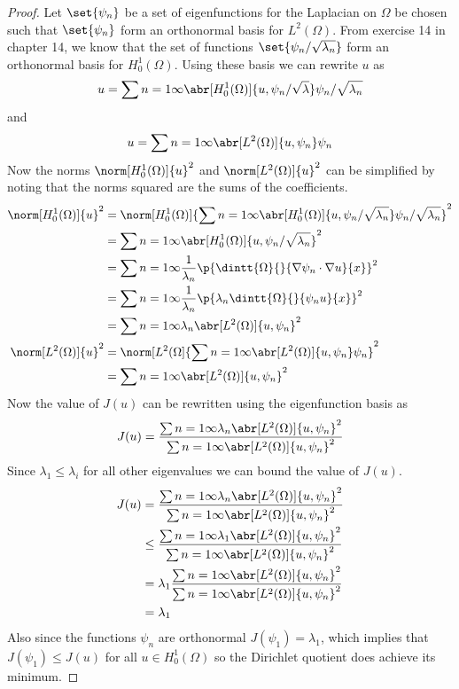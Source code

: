 \documentclass[11pt, oneside]{article}
\begin{document}
\begin{enumerate}
    \begin{proof}
      Let $\set{\psi_n}$ be a set of eigenfunctions for the Laplacian on $\Omega$
      be chosen such that $\set{\psi_n}$ form an orthonormal basis for $L^2(\Omega)$.
      From exercise 14 in chapter 14, we know that the set of functions
      $\set{\psi_n/\sqrt{\lambda_n}}$ form an orthonormal basis for $H^1_0(\Omega)$.
      Using these basis we can rewrite $u$ as
      \[
        u = \sum{n = 1}{\infty}{\abr[H_0^1(\Omega)]{u, \psi_n/\sqrt{\lambda}} \psi_n/\sqrt{\lambda_n}}
      \]
      and
      \[
        u = \sum{n = 1}{\infty}{\abr[L^2(\Omega)]{u, \psi_n} \psi_n}
      \]
      Now the norms $\norm[H_0^1(\Omega)]{u}^2$ and $\norm[L^2(\Omega)]{u}^2$
      can be simplified by noting that the norms squared are the sums of the coefficients.
      \begin{align*}
        \norm[H_0^1(\Omega)]{u}^2 &= \norm[H_0^1(\Omega)]{\sum{n = 1}{\infty}{\abr[H_0^1(\Omega)]{u, \psi_n/\sqrt{\lambda_n}} \psi_n/\sqrt{\lambda_n}}}^2 \\
        &= \sum{n = 1}{\infty}{\abr[H_0^1(\Omega)]{u, \psi_n/\sqrt{\lambda_n}}^2} \\
        &= \sum{n = 1}{\infty}{\frac{1}{\lambda_n}\p{\dintt{\Omega}{}{\nabla \psi_n \cdot \nabla u}{x}}^2} \\
        &= \sum{n = 1}{\infty}{\frac{1}{\lambda_n}\p{\lambda_n\dintt{\Omega}{}{\psi_n u}{x}}^2} \\
        &= \sum{n = 1}{\infty}{\lambda_n \abr[L^2(\Omega)]{u, \psi_n}^2} \\
        \norm[L^2(\Omega)]{u}^2 &= \norm[L^2(\Omega]{\sum{n = 1}{\infty}{\abr[L^2(\Omega)]{u, \psi_n} \psi_n}}^2 \\
        &= \sum{n = 1}{\infty}{\abr[L^2(\Omega)]{u, \psi_n}^2} \\
      \end{align*}
      Now the value of $J(u)$ can be rewritten using the eigenfunction basis as
      \[
        J(u) = \frac{\sum{n = 1}{\infty}{\lambda_n \abr[L^2(\Omega)]{u, \psi_n}^2}}{\sum{n = 1}{\infty}{\abr[L^2(\Omega)]{u, \psi_n}^2}}
      \]
      Since $\lambda_1 \le \lambda_i$ for all other eigenvalues we can bound
      the value of $J(u)$.
      \begin{align*}
        J(u) &= \frac{\sum{n = 1}{\infty}{\lambda_n \abr[L^2(\Omega)]{u, \psi_n}^2}}{\sum{n = 1}{\infty}{\abr[L^2(\Omega)]{u, \psi_n}^2}} \\
        &\le \frac{\sum{n = 1}{\infty}{\lambda_1 \abr[L^2(\Omega)]{u, \psi_n}^2}}{\sum{n = 1}{\infty}{\abr[L^2(\Omega)]{u, \psi_n}^2}} \\
        &= \lambda_1\frac{\sum{n = 1}{\infty}{\abr[L^2(\Omega)]{u, \psi_n}^2}}{\sum{n = 1}{\infty}{\abr[L^2(\Omega)]{u, \psi_n}^2}} \\
        &= \lambda_1
      \end{align*}
      Also since the functions $\psi_n$ are orthonormal $J(\psi_1) = \lambda_1$,
      which implies that $J(\psi_1) \le J(u)$ for all $u \in H^1_0(\Omega)$ so
      the Dirichlet quotient does achieve its minimum.
    \end{proof}


\end{enumerate}
\end{document}
